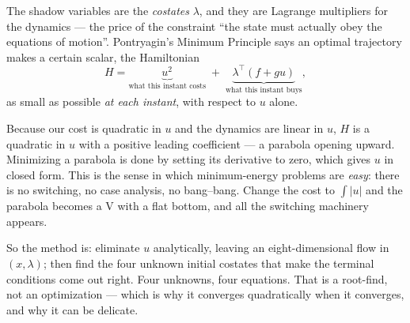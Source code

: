 \documentclass[11pt]{article}
\begin{document}
\begin{intu}
The shadow variables are the \emph{costates} $\lambda$, and they are Lagrange
multipliers for the dynamics --- the price of the constraint ``the state must
actually obey the equations of motion''. Pontryagin's Minimum Principle says an
optimal trajectory makes a certain scalar, the Hamiltonian
\[
H = \underbrace{u^2}_{\text{what this instant costs}} \;+\; \underbrace{\lambda^\top(f+gu)}_{\text{what this instant buys}},
\]
as small as possible \emph{at each instant}, with respect to $u$ alone.

Because our cost is quadratic in $u$ and the dynamics are linear in $u$, $H$ is a
quadratic in $u$ with a positive leading coefficient --- a parabola opening
upward. Minimizing a parabola is done by setting its derivative to zero, which
gives $u$ in closed form. This is the sense in which minimum-energy problems are
\emph{easy}: there is no switching, no case analysis, no bang--bang. Change the
cost to $\int|u|$ and the parabola becomes a V with a flat bottom, and all the
switching machinery appears.

So the method is: eliminate $u$ analytically, leaving an eight-dimensional flow
in $(x,\lambda)$; then find the four unknown initial costates that make the
terminal conditions come out right. Four unknowns, four equations. That is a
root-find, not an optimization --- which is why it converges quadratically when
it converges, and why it can be delicate.
\end{intu}
\end{document}
